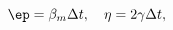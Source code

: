 \begin{equation}
\ep = \beta_m \Delta t,\quad \eta = 2 \gamma \Delta t,
\label{defbetamgamma} 
\end{equation}

